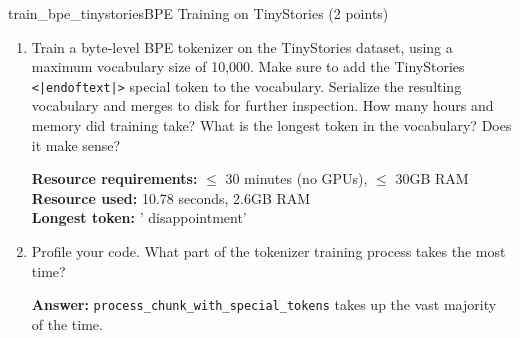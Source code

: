 \begin{problembox}{train\_bpe\_tinystories}{BPE Training on TinyStories (2 points)}

    \begin{enumerate}[label=(\alph*), itemsep=1em, topsep=0pt]

        \item Train a byte-level BPE tokenizer on the TinyStories dataset, using a maximum vocabulary size of 10,000. Make sure to add the TinyStories \texttt{\textless|endoftext|\textgreater} special token to the vocabulary. Serialize the resulting vocabulary and merges to disk for further inspection. How many hours and memory did training take? What is the longest token in the vocabulary? Does it make sense?

              \textbf{Resource requirements:} $\le$ 30 minutes (no GPUs), $\le$ 30GB RAM \\
              \textbf{Resource used:} 10.78 seconds, 2.6GB RAM \\
              \textbf{Longest token:} ' disappointment'

        \item Profile your code. What part of the tokenizer training process takes the most time?

              \textbf{Answer:} \texttt{process_chunk_with_special_tokens} takes up the vast majority of the time.

    \end{enumerate}

\end{problembox}

\boxseparator

